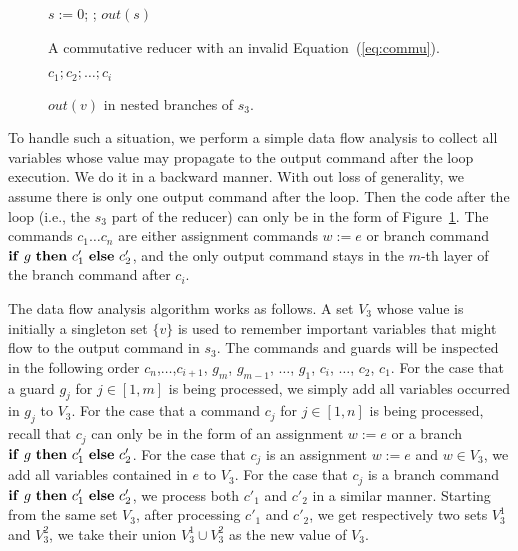 \documentclass{llncs}
\newcommand{\cur}{cur()}
\newcommand{\ite}[3]{
	 \ifmmode
	 \mathbf{if}\ #1 \ \mathbf{then}\ #2\  \mathbf{else}\ #3
	 \else
	 \textbf{if}\ #1 \ \textbf{then}\ #2\  \textbf{else}\ #3
	 \fi}
\begin{document}
\begin{figure}[hbt]
	\begin{minipage}{0.4\textwidth}
		\begin{algorithm}[H]
			$s:= 0$; \;
			\Loop{}{
				$t:=\cur$;
				$s:= s + t$\;
			};
			$out(s)$\;\;
		\end{algorithm}
		\caption{A commutative reducer with an invalid Equation~(\ref{eq:commu}).}
		\label{fig:reducer_opt}
	\end{minipage}
	\begin{minipage}{0.55\textwidth}
		\centering
		\begin{minipage}{0.75\textwidth}
		\begin{algorithm}[H]
			$c_1;c_2;\ldots;c_i$\;
			\lElse{ $\ldots$}
		\end{algorithm}
	\end{minipage}
		\caption{$out(v)$ in nested branches of $s_3$.}
		\label{fig:nested_out}
	\end{minipage}
\end{figure}


To handle such a situation, we perform a simple data flow analysis to collect all variables whose value may propagate to the output command after the loop execution. We do it in a backward manner.  With out loss of generality, we assume there is only one output command after the loop. Then the code after the loop (i.e., the $s_3$ part of the reducer) can only be in the form of Figure~\ref{fig:nested_out}.
The commands $c_1\ldots c_n$ are either assignment commands $w:=e$ or branch command $\ite{g}{c'_1}{c'_2}$, and the only output command stays in the $m$-th layer of the branch command after $c_i$.

The data flow analysis algorithm works as follows.
A set $V_3$ whose value is initially a singleton set $\{v\}$ is used to remember important variables that might flow to the output command in $s_3$.
The commands and guards will be inspected in the following order $c_{n}$,$\ldots$,$c_{i+1}$, $g_m$, $g_{m-1}$, $\ldots$, $g_1$, $c_i$, $\ldots$, $c_2$, $c_1$. For the case that a guard $g_j$ for $j\in [1,m]$ is being processed, we simply add all variables occurred in $g_j$ to $V_3$.
For the case that a command $c_j$ for $j\in [1,n]$ is being processed,
recall that $c_j$ can only be in the form of an assignment $w:=e$ or a branch $\ite{g}{c'_1}{c'_2}$.
For the case that $c_j$ is an assignment $w:=e$ and $w\in V_3$, we add all variables contained in $e$ to $V_3$. For the case that $c_j$ is a branch command $\ite{g}{c'_1}{c'_2}$, we process both $c'_1$ and $c'_2$ in a similar manner. Starting from the same set $V_3$,  after processing $c'_1$ and $c'_2$, we get respectively two sets $V_3^1$ and $V_3^2$, we take their union $V_3^1\cup V_3^2$ as the new value of $V_3$.
\end{document}
